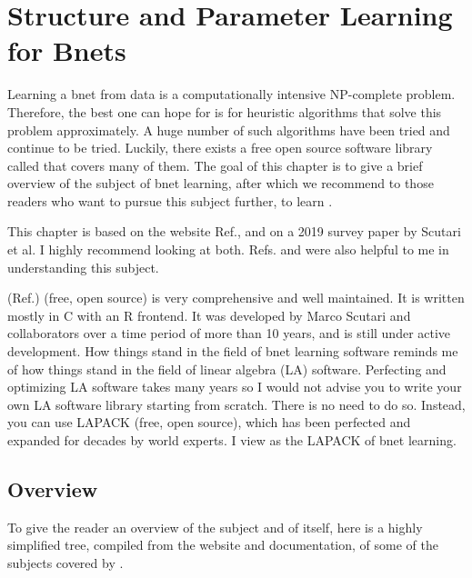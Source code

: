 \chapter{Structure and Parameter
 Learning for Bnets}\label{ch-struc-learn}


Learning a bnet
from data
is a computationally intensive NP-complete
problem. 
Therefore,
the best one can hope
for is for heuristic algorithms 
that solve this problem
approximately. A huge number 
of such algorithms have been tried
and continue to be tried.
Luckily,
there exists a free open source
 software library
called \bnlearn
that covers many of
them. The goal
of this chapter
is to give
a brief
overview
of the subject
of bnet 
learning,
after 
which
we recommend
to
those readers who
want to
pursue this subject
further,
to 
learn \bnlearn.

This chapter
is based on  
the \bnlearn website Ref.\cite{bnlearn}, and
on a 2019 survey
paper 
\cite{scutari2019}
by Scutari et al.
I highly recommend looking
at both. Refs.
\cite{carvalho} and \cite{margaritis}
were also
helpful to me in understanding this subject.

\bnlearn (Ref.\cite{bnlearn})
(free, open source) is 
very
comprehensive
and well
maintained. It
is 
written 
mostly in C with
an R frontend.
It was
developed by Marco Scutari
and collaborators
over a time period of
more than 10 years,
and is still
under active development.
How things stand
in the field of
bnet learning software reminds me
of how things stand in 
the field of linear 
algebra (LA) software. Perfecting and
optimizing
LA software
takes many years so
I would not
advise you to write your own
LA software library starting
from scratch.
There is no need to do so. Instead, you
can use LAPACK (free, open source), which
has been perfected and expanded
for decades by world experts. 
I view \bnlearn as the LAPACK
of bnet learning. 



\section*{Overview}

To give
the reader an overview
of the subject
and of \bnlearn itself,
here is a highly
simplified tree,
compiled from
the \bnlearn website
and documentation,
of some of the
subjects covered by \bnlearn.



